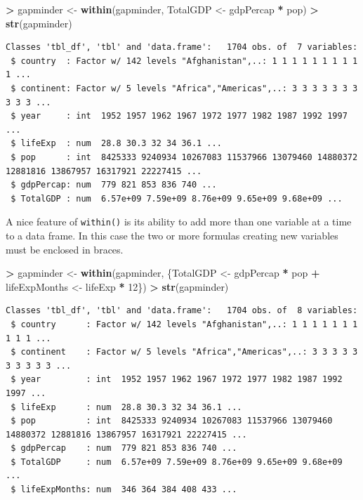 \documentclass[]{krantz}
\makeatletter
\newenvironment{Shaded}{\begin{snugshade}}{\end{snugshade}}
\newcommand{\KeywordTok}[1]{\textcolor[rgb]{0.27,0.27,0.27}{\textbf{#1}}}
\newcommand{\DecValTok}[1]{\textcolor[rgb]{0.06,0.06,0.06}{#1}}
\newcommand{\StringTok}[1]{\textcolor[rgb]{0.5,0.5,0.5}{#1}}
\newcommand{\OperatorTok}[1]{\textcolor[rgb]{0.43,0.43,0.43}{\textbf{#1}}}
\newcommand{\NormalTok}[1]{#1}
\newenvironment{kframe}{%
\medskip{}
\setlength{\fboxsep}{.8em}
 \def\at@end@of@kframe{}%
 \ifinner\ifhmode%
  \def\at@end@of@kframe{\end{minipage}}%
  \begin{minipage}{\columnwidth}%
 \fi\fi%
 \def\FrameCommand##1{\hskip\@totalleftmargin \hskip-\fboxsep
 \colorbox{shadecolor}{##1}\hskip-\fboxsep
     \hskip-\linewidth \hskip-\@totalleftmargin \hskip\columnwidth}%
 \MakeFramed {\advance\hsize-\width
   \@totalleftmargin\z@ \linewidth\hsize
   \@setminipage}}%
 {\par\unskip\endMakeFramed%
 \at@end@of@kframe}
\renewenvironment{Shaded}{\begin{kframe}}{\end{kframe}}
\makeatother
\begin{document}
\begin{Shaded}
\begin{Highlighting}[]
\OperatorTok{>}\StringTok{ }\NormalTok{gapminder <-}\StringTok{ }\KeywordTok{within}\NormalTok{(gapminder, TotalGDP <-}\StringTok{ }\NormalTok{gdpPercap }\OperatorTok{*}\StringTok{ }\NormalTok{pop)}
\OperatorTok{>}\StringTok{ }\KeywordTok{str}\NormalTok{(gapminder)}
\end{Highlighting}
\end{Shaded}

\begin{verbatim}
Classes 'tbl_df', 'tbl' and 'data.frame':   1704 obs. of  7 variables:
 $ country  : Factor w/ 142 levels "Afghanistan",..: 1 1 1 1 1 1 1 1 1 1 ...
 $ continent: Factor w/ 5 levels "Africa","Americas",..: 3 3 3 3 3 3 3 3 3 3 ...
 $ year     : int  1952 1957 1962 1967 1972 1977 1982 1987 1992 1997 ...
 $ lifeExp  : num  28.8 30.3 32 34 36.1 ...
 $ pop      : int  8425333 9240934 10267083 11537966 13079460 14880372 12881816 13867957 16317921 22227415 ...
 $ gdpPercap: num  779 821 853 836 740 ...
 $ TotalGDP : num  6.57e+09 7.59e+09 8.76e+09 9.65e+09 9.68e+09 ...
\end{verbatim}

A nice feature of \texttt{within()} is its ability to add more than one
variable at a time to a data frame. In this case the two or more
formulas creating new variables must be enclosed in braces.

\begin{Shaded}
\begin{Highlighting}[]
\OperatorTok{>}\StringTok{ }\NormalTok{gapminder <-}\StringTok{ }\KeywordTok{within}\NormalTok{(gapminder, \{TotalGDP <-}\StringTok{ }\NormalTok{gdpPercap }\OperatorTok{*}\StringTok{ }\NormalTok{pop}
\OperatorTok{+}\StringTok{     }\NormalTok{lifeExpMonths <-}\StringTok{ }\NormalTok{lifeExp }\OperatorTok{*}\StringTok{ }\DecValTok{12}\NormalTok{\})}
\OperatorTok{>}\StringTok{ }\KeywordTok{str}\NormalTok{(gapminder)}
\end{Highlighting}
\end{Shaded}

\begin{verbatim}
Classes 'tbl_df', 'tbl' and 'data.frame':   1704 obs. of  8 variables:
 $ country      : Factor w/ 142 levels "Afghanistan",..: 1 1 1 1 1 1 1 1 1 1 ...
 $ continent    : Factor w/ 5 levels "Africa","Americas",..: 3 3 3 3 3 3 3 3 3 3 ...
 $ year         : int  1952 1957 1962 1967 1972 1977 1982 1987 1992 1997 ...
 $ lifeExp      : num  28.8 30.3 32 34 36.1 ...
 $ pop          : int  8425333 9240934 10267083 11537966 13079460 14880372 12881816 13867957 16317921 22227415 ...
 $ gdpPercap    : num  779 821 853 836 740 ...
 $ TotalGDP     : num  6.57e+09 7.59e+09 8.76e+09 9.65e+09 9.68e+09 ...
 $ lifeExpMonths: num  346 364 384 408 433 ...
\end{verbatim}
\end{document}
